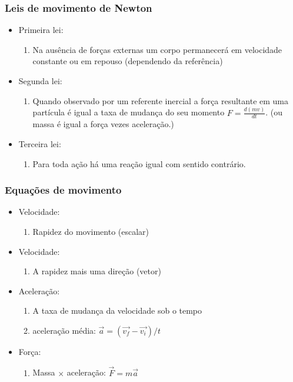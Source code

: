\begin{frame}
\frametitle{Leis de movimento de Newton}

  \begin{itemize}[<+-| alert@+>]
    \item Primeira lei:
      \begin{enumerate}[<+-| alert@+>]
        \item Na ausência de forças externas um corpo permanecerá em velocidade constante ou em repouso (dependendo da referência)
      \end{enumerate}
    \item Segunda lei:
      \begin{enumerate}[<+-| alert@+>]
        \item Quando observado por um referente inercial a força resultante
              em uma partícula é igual a taxa de mudança do seu momento
              $F = \frac{d(mv)}{dt}$.
              \pause (ou massa é igual a força vezes aceleração.)
      \end{enumerate}
    \item Terceira lei:
      \begin{enumerate}[<+-| alert@+>]
        \item Para toda ação há uma reação igual com sentido contrário.
      \end{enumerate}
  \end{itemize}

\end{frame}


\begin{frame}
\frametitle{Equações de movimento}

  \begin{itemize}[<+-| alert@+>]
    \item Velocidade:
      \begin{enumerate}[<+-| alert@+>]
        \item Rapidez do movimento (escalar)
      \end{enumerate}
    \item Velocidade:
      \begin{enumerate}[<+-| alert@+>]
        \item A rapidez mais uma direção (vetor)
      \end{enumerate}
    \item Aceleração:
      \begin{enumerate}[<+-| alert@+>]
        \item A taxa de mudança da velocidade sob o tempo
        \item aceleração média: $\vec{a} = (\vec{v_f} - \vec{v_i})/t$
      \end{enumerate}
    \item Força:
      \begin{enumerate}[<+-| alert@+>]
        \item Massa $\times$ aceleração: $\vec{F} = m\vec{a}$
      \end{enumerate}
  \end{itemize}
\end{frame}

